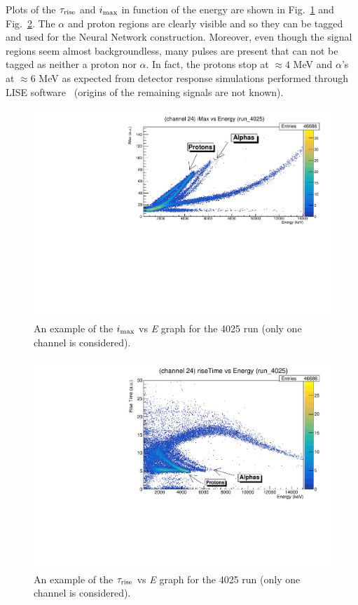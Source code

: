 \bigbreak

Plots of the $\tau _{\textup{rise}}$ and $i_{\textup{max}}$ in function of the energy
are shown in Fig.~\ref{imax} and Fig.~\ref{risetime}. The $\alpha$ and proton
regions are clearly visible and so they can be tagged and used for the
Neural Network construction. Moreover, even though the signal regions seem almost
backgroundless, many pulses are present that can not be tagged as neither a
proton nor $\alpha$. In fact, the protons stop at $\approx 4$ MeV and
$\alpha$'s at $\approx 6$ MeV as expected from detector response simulations
performed through LISE software~\cite{lise} (origins of the remaining signals
are not known).

\begin{figure}[h]
  \centering
  \includegraphics[scale=.6]{img/iMax_4025.pdf}
  \caption{An example of the $i_{\textup{max}}$ vs \textit{E} graph for the 4025 run (only one channel is considered).}
  \label{imax}
\end{figure}

\begin{figure}[h]
  \centering
  \includegraphics[scale=.6]{img/riseTime_4025.pdf}
  \caption{An example of the $\tau _{\textup{rise}}$ vs \textit{E} graph for the 4025 run (only one channel is considered).}
  \label{risetime}
\end{figure}

\clearpage
